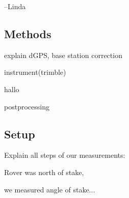 --Linda

\subsection{Methods}
explain dGPS, base station correction

instrument(trimble)

hallo \cite{holton2012}

postprocessing


\subsection{Setup}
Explain all steps of our measurements:

Rover was north of stake,

we measured angle of stake...